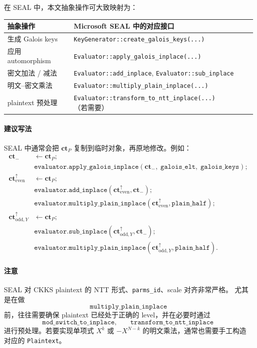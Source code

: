 \documentclass[11pt,a4paper]{ctexart}
\newcommand{\ctP}{\mathbf{ct}_{P}}
\newcommand{\ctm}{\mathbf{ct}_{-}}
\newcommand{\cte}{\mathbf{ct}_{\mathrm{even}}^{\uparrow}}
\newcommand{\ctoy}{\mathbf{ct}_{\mathrm{odd},Y}^{\uparrow}}
\begin{document}
在 SEAL 中，本文抽象操作可大致映射为：

\begin{center}
\begin{tabular}{>{\raggedright\arraybackslash}p{} >{\raggedright\arraybackslash}p{}}
\toprule
抽象操作 & Microsoft SEAL 中的对应接口 \\ \midrule
生成 Galois keys &
\texttt{KeyGenerator::create\_galois\_keys(...)} \\[4pt]
应用 automorphism &
\texttt{Evaluator::apply\_galois\_inplace(...)} \\[4pt]
密文加法 / 减法 &
\texttt{Evaluator::add\_inplace}, \texttt{Evaluator::sub\_inplace} \\[4pt]
明文--密文乘法 &
\texttt{Evaluator::multiply\_plain\_inplace(...)} \\[4pt]
plaintext 预处理 &
\texttt{Evaluator::transform\_to\_ntt\_inplace(...)}（若需要） \\[4pt]
\bottomrule
\end{tabular}
\end{center}

\paragraph{建议写法}
SEAL 中通常会把 \(\ctP\) 复制到临时对象，再原地修改。例如：
\begin{align*}
\ctm &\leftarrow \ctP;\\
&\texttt{evaluator.apply\_galois\_inplace}(\ctm,\; \texttt{galois\_elt},\; \texttt{galois\_keys});\\
\cte &\leftarrow \ctP;\\
&\texttt{evaluator.add\_inplace}(\cte,\ctm);\\
&\texttt{evaluator.multiply\_plain\_inplace}(\cte,\texttt{plain\_half});\\
\ctoy &\leftarrow \ctP;\\
&\texttt{evaluator.sub\_inplace}(\ctoy,\ctm);\\
&\texttt{evaluator.multiply\_plain\_inplace}(\ctoy,\texttt{plain\_half}).
\end{align*}

\paragraph{注意}
SEAL 对 CKKS plaintext 的 NTT 形式、\texttt{parms\_id}、scale 对齐非常严格。  
尤其是在做
\[
\texttt{multiply\_plain\_inplace}
\]
前，往往需要确保 plaintext 已经处于正确的 level，并在必要时通过
\[
\texttt{mod\_switch\_to\_inplace},\qquad \texttt{transform\_to\_ntt\_inplace}
\]
进行预处理。若要实现单项式 \(X^k\) 或 \(-X^{N-k}\) 的明文乘法，通常也需要手工构造对应的 \texttt{Plaintext}。
\end{document}
